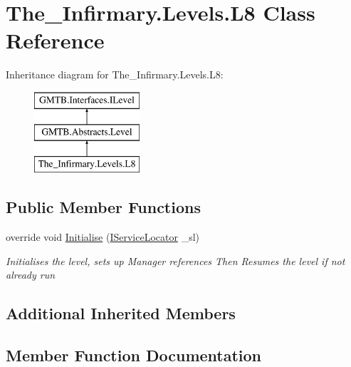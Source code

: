 \hypertarget{class_the___infirmary_1_1_levels_1_1_l8}{}\section{The\+\_\+\+Infirmary.\+Levels.\+L8 Class Reference}
\label{class_the___infirmary_1_1_levels_1_1_l8}
Inheritance diagram for The\+\_\+\+Infirmary.\+Levels.\+L8\+:\begin{figure}[H]
\begin{center}
\leavevmode
\includegraphics[height=3.000000cm]{class_the___infirmary_1_1_levels_1_1_l8}
\end{center}
\end{figure}
\subsection*{Public Member Functions}
\begin{DoxyCompactItemize}
\item 
override void \mbox{\hyperlink{class_the___infirmary_1_1_levels_1_1_l8_af246318b7f74c9491887facd3d6face0}{Initialise}} (\mbox{\hyperlink{interface_g_m_t_b_1_1_interfaces_1_1_i_service_locator}{I\+Service\+Locator}} \+\_\+sl)
\begin{DoxyCompactList}\small\item\em Initialises the level, sets up Manager references Then Resumes the level if not already run \end{DoxyCompactList}\end{DoxyCompactItemize}
\subsection*{Additional Inherited Members}


\subsection{Member Function Documentation}
\mbox{\label{class_the___infirmary_1_1_levels_1_1_l8_af246318b7f74c9491887facd3d6face0}} 
